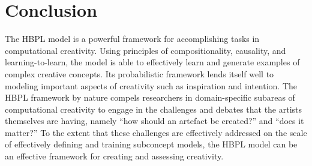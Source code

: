 \documentclass[letterpaper]{article}
\begin{document}
\section{Conclusion}

The HBPL model is a powerful framework for accomplishing tasks in computational creativity. Using principles of compositionality, causality, and learning-to-learn, the model is able to effectively learn and generate examples of complex creative concepts. Its probabilistic framework lends itself well to modeling important aspects of creativity such as inspiration and intention. The HBPL framework by nature compels researchers in domain-specific subareas of computational creativity to engage in the challenges and debates that the artists themselves are having, namely ``how should an artefact be created?'' and ``does it matter?'' To the extent that these challenges are effectively addressed on the scale of effectively defining and training subconcept models, the HBPL model can be an effective framework for creating and assessing creativity.



\end{document}
